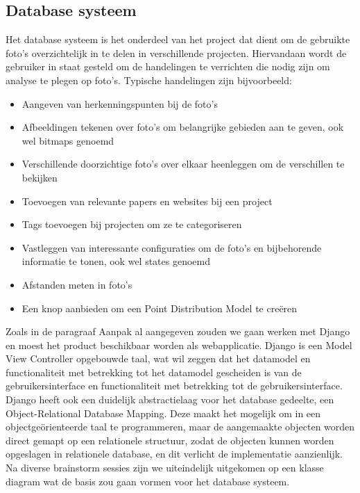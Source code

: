 \subsection{Database systeem}
\label{aanpak_database_systeem}
Het database systeem is het onderdeel van het project dat dient om de gebruikte foto's overzichtelijk in te delen in verschillende projecten. Hiervandaan wordt de gebruiker in staat gesteld om de handelingen te verrichten die nodig zijn om analyse te plegen op foto's. Typische handelingen zijn bijvoorbeeld: 

\begin{itemize}
\item Aangeven van herkenningspunten bij de foto's
\item Afbeeldingen tekenen over foto's om belangrijke gebieden aan te geven, ook wel bitmaps genoemd
\item Verschillende doorzichtige foto's over elkaar heenleggen om de verschillen te bekijken
\item Toevoegen van relevante papers en websites bij een project
\item Tags toevoegen bij projecten om ze te categoriseren
\item Vastleggen van interessante configuraties om de foto's en bijbehorende informatie te tonen, ook wel states genoemd
\item Afstanden meten in foto's
\item Een knop aanbieden om een Point Distribution Model te cre\"{e}ren
\end{itemize}

Zoals in de paragraaf Aanpak al aangegeven zouden we gaan werken met Django en moest het product beschikbaar worden als webapplicatie. Django is een Model View Controller opgebouwde taal, wat wil zeggen dat het datamodel en functionaliteit met betrekking tot het datamodel gescheiden is van de gebruikersinterface en functionaliteit met betrekking tot de gebruikersinterface. Django heeft ook een duidelijk abstractielaag voor het database gedeelte, een Object-Relational Database Mapping. Deze maakt het mogelijk om in een object\-ge\"{o}rienteerde taal te programmeren, maar de aangemaakte objecten worden direct gemapt op een relationele structuur, zodat de objecten kunnen worden opgeslagen in relationele database, en dit verlicht de implementatie aanzienlijk. Na diverse brainstorm sessies zijn we uiteindelijk uitgekomen op een klasse diagram\pageref{Databasediagram} wat de basis zou gaan vormen voor het database systeem.

